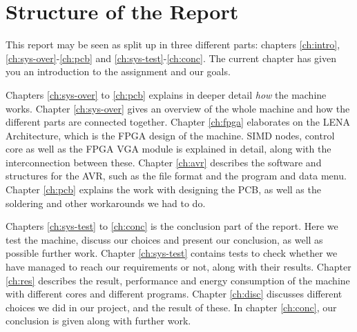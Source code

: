 \section{Structure of the Report}

This report may be seen as split up in three different parts: chapters
\ref{ch:intro}, \ref{ch:sys-over}-\ref{ch:pcb} and
\ref{ch:sys-test}-\ref{ch:conc}.  The
current chapter has given you an introduction to the assignment and our goals.

Chapters \ref{ch:sys-over} to \ref{ch:pcb} explains in deeper detail {\em how}
the machine works. Chapter \ref{ch:sys-over} gives an overview of the whole
machine and how the different parts are connected together. Chapter
\ref{ch:fpga} elaborates on the \ac{LENA} Architecture, which is the \ac{FPGA}
design of the machine. \ac{SIMD} nodes, control core as well as the \ac{FPGA}
\ac{VGA} module is explained in detail, along with the interconnection between
these. Chapter \ref{ch:avr} describes the software and structures for the AVR,
such as the file format and the program and data menu. Chapter \ref{ch:pcb}
explains the work with designing the \ac{PCB}, as well as the soldering and
other workarounds we had to do.

Chapters \ref{ch:sys-test} to \ref{ch:conc} is the conclusion part of the
report. Here we test the machine, discuss our choices and present our
conclusion, as well as possible further work. Chapter \ref{ch:sys-test} contains
tests to check whether we have managed to reach our requirements or not, along
with their results. Chapter \ref{ch:res} describes the result, performance and
energy consumption of the machine with different cores and different
programs. Chapter \ref{ch:disc} discusses different choices we did in our
project, and the result of these. In chapter \ref{ch:conc}, our conclusion is
given along with further work.
